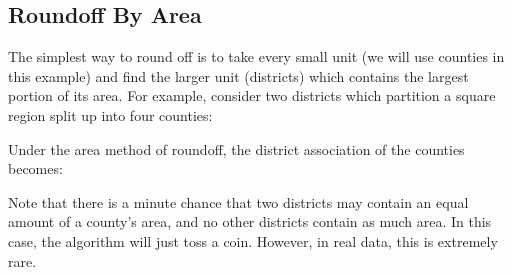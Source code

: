\subsection{Roundoff By Area}
The simplest way to round off is to take every small unit (we will 
use counties in this example) and find the larger unit (districts) 
which contains the largest portion of its area. For example, 
consider two districts which partition a square region split 
up into four counties:
\begin{center}
\end{center}
Under the area method of roundoff, the district association of the 
counties becomes:
\begin{center}
\end{center}
Note that there is a minute chance that two districts may contain 
an equal amount of a county's area, and no other districts contain as 
much area. In this case, the algorithm will just toss a coin. However, 
in real data, this is extremely rare.
